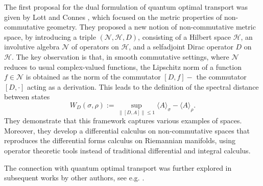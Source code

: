 \documentclass[11pt,reqno]{amsart}
\numberwithin{equation}{section}
\newcommand{\mc}{\mathcal}
\begin{document}
The first proposal for the dual formulation of quantum optimal transport was given by Lott and Connes \cite{connes1992metric}, which focused on the metric properties of non-commutative geometry. They proposed a new notion of non-commutative metric space, by introducing a triple $(\mc N, \mathcal{H}, D)$, consisting of a Hilbert space $\mathcal{H}$, an involutive algebra $\mc N$ of operators on $\mathcal{H}$, and a selfadjoint Dirac operator $D$ on $\mathcal{H}$. The key observation is that, in smooth commutative settings, where $\mc N$ reduces to usual complex-valued functions, the Lipschitz norm of a function $f \in \mc N$ is obtained as the norm of the commutator $[D, f]-$ the commutator $[D, \cdot]$ acting as a derivation. This leads to the definition of the spectral distance between states 
\begin{equation}
    W_{D}(\sigma, \rho):=\sup _{\|[D, A]\| \leq 1}\langle A\rangle_\sigma-\langle A\rangle_\rho.
\end{equation}
They demonstrate that this framework captures various examples of spaces. Moreover, they develop a differential calculus on non-commutative spaces that reproduces the differential forms calculus on Riemannian manifolds, using operator theoretic tools instead of traditional differential and integral calculus. 

The connection with quantum optimal transport was further explored in subsequent works by other authors, see e.g. \cite{Zyczkowski_1998, rieffel1999metrics, rieffel2004compact, biane2000freeprobabilityanaloguewasserstein,D_Andrea_2010, agredo13,caglioti2021optimaltransportquantumdensities, De_Palma_2021,gaorouze24, araiza2023, Beatty_2025, anshu2025quantumwassersteindistancesquantum}. 
\end{document}
